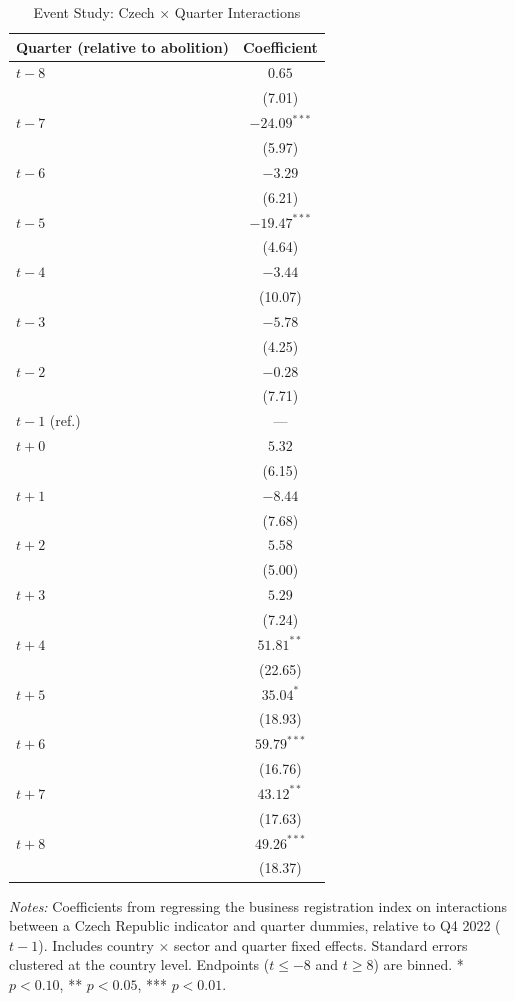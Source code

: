 
\begin{table}[H]
\centering
\caption{Event Study: Czech $\times$ Quarter Interactions}
\label{tab:eventstudy}
\begin{threeparttable}
\begin{tabular}{lc}
\toprule
Quarter (relative to abolition) & Coefficient \\
\midrule
$t-8$ & $0.65$ \\
 & (7.01) \\
$t-7$ & $-24.09^{***}$ \\
 & (5.97) \\
$t-6$ & $-3.29$ \\
 & (6.21) \\
$t-5$ & $-19.47^{***}$ \\
 & (4.64) \\
$t-4$ & $-3.44$ \\
 & (10.07) \\
$t-3$ & $-5.78$ \\
 & (4.25) \\
$t-2$ & $-0.28$ \\
 & (7.71) \\
$t-1$ (ref.) & --- \\
$t+0$ & $5.32$ \\
 & (6.15) \\
$t+1$ & $-8.44$ \\
 & (7.68) \\
$t+2$ & $5.58$ \\
 & (5.00) \\
$t+3$ & $5.29$ \\
 & (7.24) \\
$t+4$ & $51.81^{**}$ \\
 & (22.65) \\
$t+5$ & $35.04^{*}$ \\
 & (18.93) \\
$t+6$ & $59.79^{***}$ \\
 & (16.76) \\
$t+7$ & $43.12^{**}$ \\
 & (17.63) \\
$t+8$ & $49.26^{***}$ \\
 & (18.37) \\
\bottomrule
\end{tabular}
\begin{tablenotes}[flushleft]
\small
\item \textit{Notes:} Coefficients from regressing the business registration index on interactions between a Czech Republic indicator and quarter dummies, relative to Q4 2022 ($t-1$). Includes country $\times$ sector and quarter fixed effects. Standard errors clustered at the country level. Endpoints ($t \leq -8$ and $t \geq 8$) are binned. * $p<0.10$, ** $p<0.05$, *** $p<0.01$.
\end{tablenotes}
\end{threeparttable}
\end{table}

